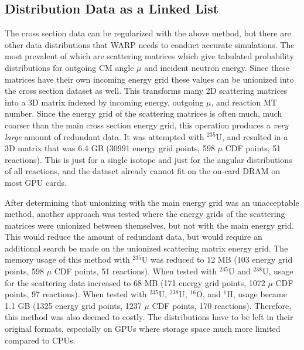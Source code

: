 \subsection{Distribution Data as a Linked List}

The cross section data can be regularized with the above method, but there are other data distributions that WARP needs to conduct accurate simulations.  The most prevalent of which are scattering matrices which give tabulated probability distributions for outgoing CM angle $\mu$ and incident neutron energy.  Since these matrices have their own incoming energy grid these values can be unionized into the cross section dataset as well.  This transforms many 2D scattering matrices into a 3D matrix indexed by incoming energy, outgoing $\mu$, and reaction MT number.  Since the energy grid of the scattering matrices is often much, much coarser than the main cross section energy grid, this operation produces a \emph{very large} amount of redundant data.  It was attempted with $^{235}$U, and resulted in a 3D matrix that was 6.4 GB (30991 energy grid points, 598 $\mu$ CDF points, 51 reactions).  This is just for a single isotope and just for the angular distributions of all reactions, and the dataset already cannot fit on the on-card DRAM on most GPU cards.  

After determining that unionizing with the main energy grid was an unacceptable method, another approach was tested where the energy grids of the scattering matrices were unionized between themselves, but not with the main energy grid.  This would reduce the amount of redundant data, but would require an additional search be made on the unionized scattering matrix energy grid.  The memory usage of this method with $^{235}$U was reduced to 12 MB (103 energy grid points, 598 $\mu$ CDF points, 51 reactions).  When tested with $^{235}$U and $^{238}$U, usage for the scattering data increased to 68 MB (171 energy grid points, 1072 $\mu$ CDF points, 97 reactions).  When tested with $^{235}$U, $^{238}$U, $^{16}$O, and $^{1}$H, usage became 1.1 GB (1325 energy grid points, 1237 $\mu$ CDF points, 170 reactions).  Therefore, this method was also deemed to costly.  The distributions have to be left in their original formats, especially on GPUs where storage space much more limited compared to CPUs.


